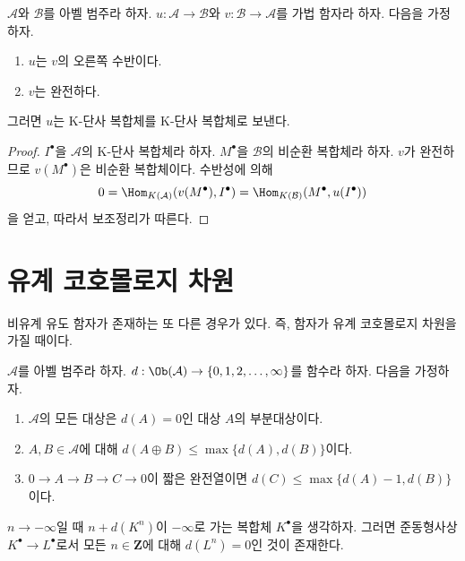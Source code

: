 \begin{lemma}
\label{lemma-adjoint-preserve-K-injectives}
$\mathcal{A}$와 $\mathcal{B}$를 아벨 범주라 하자.
$u : \mathcal{A} \to \mathcal{B}$와
$v : \mathcal{B} \to \mathcal{A}$를 가법 함자라 하자.
다음을 가정하자.
\begin{enumerate}
\item $u$는 $v$의 오른쪽 수반이다.
\item $v$는 완전하다.
\end{enumerate}
그러면 $u$는 K-단사 복합체를 K-단사 복합체로 보낸다.
\end{lemma}

\begin{proof}
$I^\bullet$을 $\mathcal{A}$의 K-단사 복합체라 하자.
$M^\bullet$을 $\mathcal{B}$의 비순환 복합체라 하자. $v$가 완전하므로
$v(M^\bullet)$은 비순환 복합체이다. 수반성에 의해
$$
0 = \Hom_{K(\mathcal{A})}(v(M^\bullet), I^\bullet) =
\Hom_{K(\mathcal{B})}(M^\bullet, u(I^\bullet))
$$
을 얻고, 따라서 보조정리가 따른다.
\end{proof}

\section{유계 코호몰로지 차원}
\label{section-bounded}

\noindent
비유계 유도 함자가 존재하는 또 다른 경우가 있다.
즉, 함자가 유계 코호몰로지 차원을 가질 때이다.

\begin{lemma}
\label{lemma-replace-resolution}
$\mathcal{A}$를 아벨 범주라 하자.
$d : \Ob(\mathcal{A}) \to \{0, 1, 2, \ldots, \infty\}$를 함수라 하자.
다음을 가정하자.
\begin{enumerate}
\item $\mathcal{A}$의 모든 대상은 $d(A) = 0$인 대상 $A$의
부분대상이다.
\item $A, B \in \mathcal{A}$에 대해
$d(A \oplus B) \leq \max \{d(A), d(B)\}$이다.
\item $0 \to A \to B \to C \to 0$이 짧은 완전열이면
$d(C) \leq \max\{d(A) - 1, d(B)\}$이다.
\end{enumerate}
$n \to -\infty$일 때 $n + d(K^n)$이 $-\infty$로 가는 복합체
$K^\bullet$을 생각하자. 그러면 준동형사상
$K^\bullet \to L^\bullet$로서 모든 $n \in \mathbf{Z}$에 대해
$d(L^n) = 0$인 것이 존재한다.
\end{lemma}

